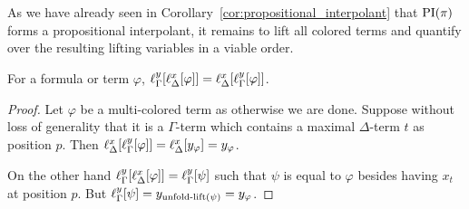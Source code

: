 As we have already seen in Corollary~\ref{cor:propositional_interpolant} that $\operatorname{PI}(\pi)$ forms a propositional interpolant, it remains to lift all colored terms and quantify over the resulting lifting variables in a viable order.


\begin{lemma}

	For a formula or term $\varphi$,
	$ \ell_{\Gamma}^{y}[ \ell_{\Delta}^{x}[ \varphi]  ] =
	\ell_{\Delta}^{x}[ \ell_{\Gamma}^{y}[ \varphi ]  ]$.
	\label{lemma:lifting_order_not_relevant}
\end{lemma}
\begin{proof}
	Let $\varphi$ be a multi-colored term as otherwise we are done.
	Suppose without loss of generality that it is a $\Gamma$-term which contains a maximal $\Delta$-term $t$ as position $p$.
	Then $\ell_{\Delta}^{x}[ \ell_{\Gamma}^{y}[ \varphi ]  ]
	= \ell_{\Delta}^{x}[ y_\varphi ]
	= y_\varphi $.

	On the other hand
	$\ell_{\Gamma}^{y}[ \ell_{\Delta}^{x}[ \varphi]  ] = \ell_{\Gamma}^{y}[ \psi ]$ such that $\psi$ is equal to $\varphi$ besides having $x_t$ at position $p$.
	But $\ell_{\Gamma}^{y}[ \psi ] = y_{\operatorname{unfold-lift}(\psi)} = y_\varphi$.
%
%
\end{proof}



